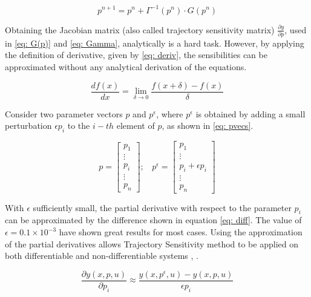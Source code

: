 \begin{equation}
	p^{n+1} = p^{n} + \Gamma^{-1}(p^{n})\cdot G(p^{n})
\end{equation}

Obtaining the Jacobian matrix (also called trajectory sensitivity matrix) $\frac{\partial y}{\partial p}$, used in \eqref{eq: G(p)} and \eqref{eq: Gamma}, analytically is a hard task. However, by applying the definition of derivative, given by \eqref{eq: deriv}, the sensibilities can be approximated without any analytical derivation of the equations.

\begin{equation}
	\frac{df(x)}{dx} = \lim\limits_{\delta \to 0} \frac{f(x + \delta) - f(x)}{\delta}
	\label{eq: deriv}
\end{equation}

Consider two parameter vectors $p$ and $p^{\epsilon}$, where $p^{\epsilon}$ is obtained by adding a small perturbation $\epsilon p_{i}$ to the $i-th$ element of $p$, as shown in \eqref{eq: pvecs}.

\begin{equation}
	p = 
	\begin{bmatrix}
		p_{1} \\
		\vdots \\
		p_{i} \\
		\vdots \\
		p_{n}
	\end{bmatrix}; \ \ \ \ 
	 p^{\epsilon} =
	\begin{bmatrix}
		p_{1} \\
		\vdots \\
		p_{i} + \epsilon p_{i} \\
		\vdots \\
		p_{n}
	\end{bmatrix}
	\label{eq: pvecs}
\end{equation}

With $\epsilon$ sufficiently small, the partial derivative with respect to the parameter $p_{i}$ can be approximated by the difference shown in equation \eqref{eq: diff}. The value of $\epsilon = 0.1 \times 10^{-3}$ have shown great results for most cases. Using the approximation of the partial derivatives allows Trajectory Sensitivity method to be applied on both differentiable and non-differentiable systems \cite{Benchluch1993}, \cite{Cari2006}.

\begin{equation}
	\frac{\partial y(x, p, u)}{\partial p_{i}} \approx \frac{y(x, p^{\epsilon}, u) - y(x, p, u)}{\epsilon p_{i}}
	\label{eq: diff}
\end{equation}

